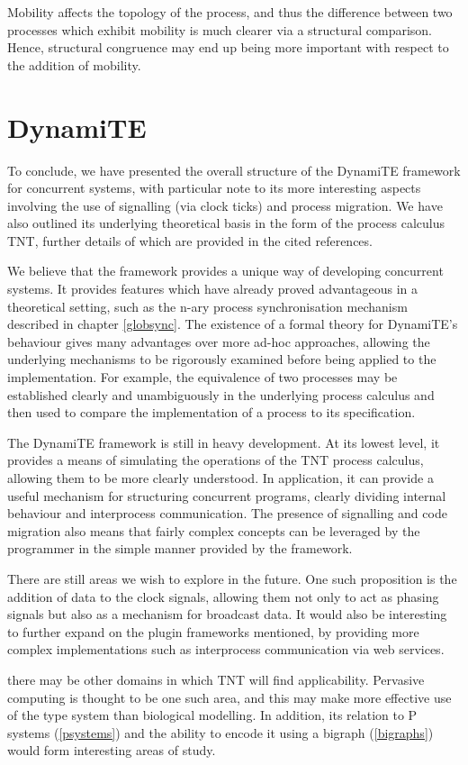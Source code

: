 Mobility affects the topology of the process, and thus the difference
between two processes which exhibit mobility is much clearer via a
structural comparison.  Hence, structural congruence may end up being
more important with respect to the addition of mobility.

\section{DynamiTE}
\label{future:dynamite}

To conclude, we have presented the overall structure of the DynamiTE
framework for concurrent systems, with particular note to its more
interesting aspects involving the use of signalling (via clock ticks)
and process migration.  We have also outlined its underlying theoretical
basis in the form of the process calculus TNT, further details of which
are provided in the cited references.

We believe that the framework provides a unique way of developing
concurrent systems.  It provides features which have already proved
advantageous in a theoretical setting, such as the n-ary process
synchronisation mechanism described in chapter \ref{globsync}.  The
existence of a formal theory for DynamiTE's behaviour gives many
advantages over more ad-hoc approaches, allowing the underlying
mechanisms to be rigorously examined before being applied to the
implementation.  For example, the equivalence of two processes may be
established clearly and unambiguously in the underlying process
calculus and then used to compare the implementation of a process to
its specification.

The DynamiTE framework is still in heavy development.  At its lowest
level, it provides a means of simulating the operations of the TNT
process calculus, allowing them to be more clearly understood.  In
application, it can provide a useful mechanism for structuring
concurrent programs, clearly dividing internal behaviour and
interprocess communication.  The presence of signalling and code
migration also means that fairly complex concepts can be leveraged by
the programmer in the simple manner provided by the framework.

There are still areas we wish to explore in the future.  One such
proposition is the addition of data to the clock signals, allowing
them not only to act as phasing signals but also as a mechanism for
broadcast data.  It would also be interesting to further expand on the
plugin frameworks mentioned, by providing more complex implementations
such as interprocess communication via web services.

there may
be other domains in which TNT will find applicability.  Pervasive
computing is thought to be one such area, and this may make more
effective use of the type system than biological modelling.  In
addition, its relation to P systems (\ref{psystems}) and the ability to
encode it using a bigraph (\ref{bigraphs}) would form interesting areas
of study.
